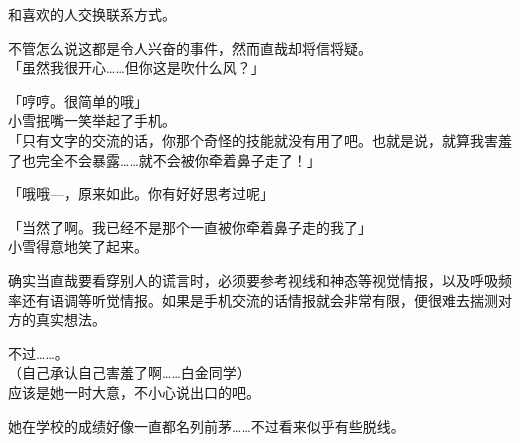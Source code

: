 和喜欢的人交换联系方式。

不管怎么说这都是令人兴奋的事件，然而直哉却将信将疑。\\

「虽然我很开心……但你这是吹什么风？」

「哼哼。很简单的哦」\\

小雪抿嘴一笑举起了手机。\\

「只有文字的交流的话，你那个奇怪的技能就没有用了吧。也就是说，就算我害羞了也完全不会暴露……就不会被你牵着鼻子走了！」

「哦哦—，原来如此。你有好好思考过呢」

「当然了啊。我已经不是那个一直被你牵着鼻子走的我了」\\

小雪得意地笑了起来。

确实当直哉要看穿别人的谎言时，必须要参考视线和神态等视觉情报，以及呼吸频率还有语调等听觉情报。如果是手机交流的话情报就会非常有限，便很难去揣测对方的真实想法。

不过……。\\

（自己承认自己害羞了啊……白金同学）\\

应该是她一时大意，不小心说出口的吧。

她在学校的成绩好像一直都名列前茅……不过看来似乎有些脱线。\\

